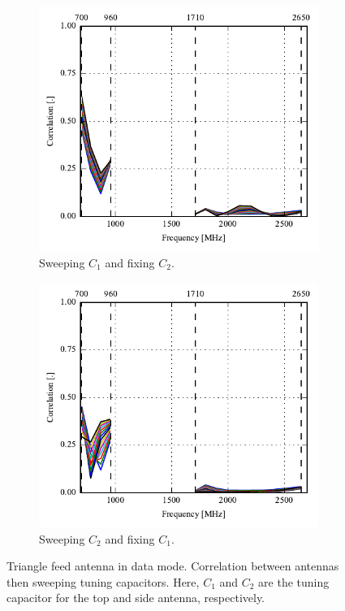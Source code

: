 \begin{figure}[htbp]
    \centering
    \begin{subfigure}{0.49\linewidth}
        \includegraphics{img/tech_sol/trianglefeed/data_mode/correlation_Csh1-sweep}
        \caption{Sweeping $C_1$ and fixing $C_2$.}
    \end{subfigure}
    \hfill
    \begin{subfigure}{0.49\linewidth}
        \includegraphics{img/tech_sol/trianglefeed/data_mode/correlation_Csh2-sweep}
        \caption{Sweeping $C_2$ and fixing $C_1$.}
    \end{subfigure}
    \caption{Triangle feed antenna in data mode. Correlation between antennas then sweeping tuning capacitors. Here, $C_1$ and $C_2$ are the tuning capacitor for the top and side antenna, respectively.}
    \label{fig:corr_sol2_data}
\end{figure}


